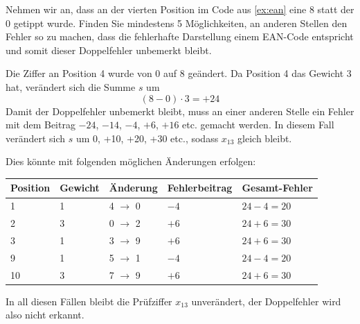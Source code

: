 \begin{myexercise}
    Nehmen wir an, dass an der vierten Position im Code aus \cref{ex:ean} eine 8 statt der 0 getippt wurde. Finden Sie mindestens 5 Möglichkeiten, an anderen Stellen den Fehler so zu machen, dass die fehlerhafte Darstellung einem \gls{EAN}-Code entspricht und somit dieser Doppelfehler unbemerkt bleibt.
    \begin{myanswer}
        Die Ziffer an Position 4 wurde von 0 auf 8 geändert. Da Position 4 das Gewicht 3 hat, verändert sich die Summe $s$ um
        \[
            (8-0) \cdot 3 = +24
        \]
        Damit der Doppelfehler unbemerkt bleibt, muss an einer anderen Stelle ein Fehler mit dem Beitrag $-24$, $-14$, $-4$, $+6$, $+16$ etc. gemacht werden. In diesem Fall verändert sich $s$ um 0, +10, +20, +30 etc., sodass $x_{13}$ gleich bleibt.

        Dies könnte mit folgenden möglichen Änderungen erfolgen:
        \begin{center}
            \begin{tabular}{lllll}
                \textbf{Position} & \textbf{Gewicht} & \textbf{Änderung} & \textbf{Fehlerbeitrag} & \textbf{Gesamt-Fehler} \\
                \midrule
                1                 & 1                & 4 $\rightarrow$ 0 & $-4$                   & $24-4=20$              \\\midrule
                2                 & 3                & 0 $\rightarrow$ 2 & $+6$                   & $24+6=30$              \\\midrule
                3                 & 1                & 3 $\rightarrow$ 9 & $+6$                   & $24+6=30$              \\\midrule
                9                 & 1                & 5 $\rightarrow$ 1 & $-4$                   & $24-4=20$              \\\midrule
                10                & 3                & 7 $\rightarrow$ 9 & $+6$                   & $24+6=30$              \\
            \end{tabular}
        \end{center}

        In all diesen Fällen bleibt die Prüfziffer $x_{13}$ unverändert, der Doppelfehler wird also nicht erkannt.

    \end{myanswer}
\end{myexercise}

